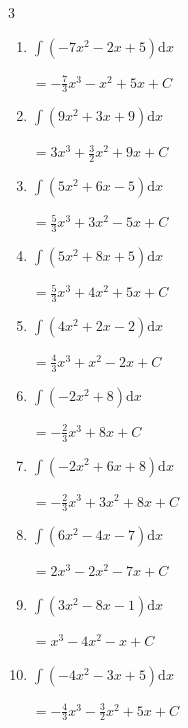 \begin{multicols}{3}
\begin{enumerate}
        $\displaystyle =-2x^{3}+\frac{5}{2}x^{2}+2x+ C$

  \item $\displaystyle \int \left( -7x^{2}-2x+5 \right) \mathrm{d}x$

        $\displaystyle =-\frac{7}{3}x^{3}-x^{2}+5x+ C$

  \item $\displaystyle \int \left( 9x^{2}+3x+9 \right) \mathrm{d}x$

        $\displaystyle =3x^{3}+\frac{3}{2}x^{2}+9x+ C$

  \item $\displaystyle \int \left( 5x^{2}+6x-5 \right) \mathrm{d}x$

        $\displaystyle =\frac{5}{3}x^{3}+3x^{2}-5x+ C$

  \item $\displaystyle \int \left( 5x^{2}+8x+5 \right) \mathrm{d}x$

        $\displaystyle =\frac{5}{3}x^{3}+4x^{2}+5x+ C$

\columnbreak %

\resetques

  \item $\displaystyle \int \left( 4x^{2}+2x-2 \right) \mathrm{d}x$

        $\displaystyle =\frac{4}{3}x^{3}+x^{2}-2x+ C$

  \item $\displaystyle \int \left( -2x^{2}+8 \right) \mathrm{d}x$

        $\displaystyle =-\frac{2}{3}x^{3}+8x+ C$

  \item $\displaystyle \int \left( -2x^{2}+6x+8 \right) \mathrm{d}x$

        $\displaystyle =-\frac{2}{3}x^{3}+3x^{2}+8x+ C$

  \item $\displaystyle \int \left( 6x^{2}-4x-7 \right) \mathrm{d}x$

        $\displaystyle =2x^{3}-2x^{2}-7x+ C$

  \item $\displaystyle \int \left( 3x^{2}-8x-1 \right) \mathrm{d}x$

        $\displaystyle =x^{3}-4x^{2}-x+ C$

  \item $\displaystyle \int \left( -4x^{2}-3x+5 \right) \mathrm{d}x$

        $\displaystyle =-\frac{4}{3}x^{3}-\frac{3}{2}x^{2}+5x+ C$


\end{enumerate}
\end{multicols}
